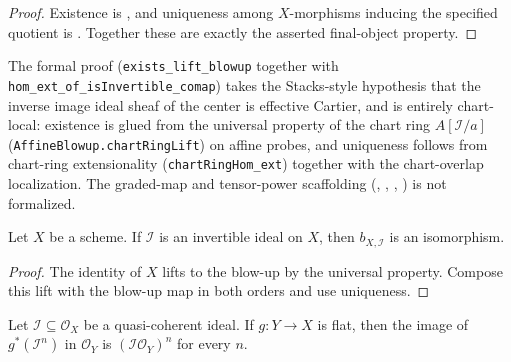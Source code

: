 \begin{proof}
  \leanok
  Existence is , and uniqueness
  among $X$-morphisms inducing the specified quotient is
  .  Together these are exactly the
  asserted final-object property.
\end{proof}

\begin{remark}
  The formal proof (\texttt{exists\_lift\_blowup} together with
  \texttt{hom\_ext\_of\_isInvertible\_comap}) takes the
  Stacks-style hypothesis that the inverse image ideal sheaf of the center is
  effective Cartier, and is entirely chart-local: existence is glued from the
  universal property of the chart ring $A[\mathcal I/a]$
  (\texttt{AffineBlowup.chartRingLift}) on affine probes, and uniqueness
  follows from chart-ring extensionality
  (\texttt{chartRingHom\_ext}) together with the chart-overlap localization.
  The graded-map and tensor-power scaffolding
  (,
  ,
  ,
  ) is not formalized.
\end{remark}

\begin{corollary}
  \label{cor:nagata-blowup-cartier-iso}
  \leanok

  Let $X$ be a scheme.  If $\mathcal I$ is an invertible ideal on $X$, then
  $b_{X,\mathcal I}$ is an isomorphism.
\end{corollary}

\begin{proof}
  \leanok
  The identity of $X$ lifts to the blow-up by the universal property.  Compose
  this lift with the blow-up map in both orders and use uniqueness.
\end{proof}

\begin{lemma}
  \label{lemma:nagata-flat-pullback-ideal-pow}

  Let $\mathcal I\subseteq\mathcal O_X$ be a quasi-coherent ideal.  If
  $g\colon Y\to X$ is flat, then the image of $g^*(\mathcal I^n)$ in
  $\mathcal O_Y$ is $(\mathcal I\mathcal O_Y)^n$ for every $n$.
\end{lemma}

